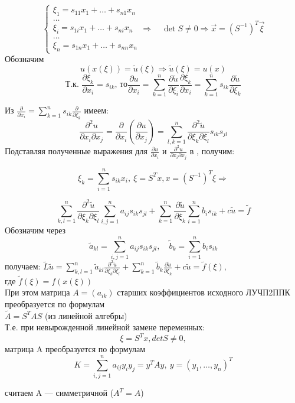 \[
\begin{cases}
\xi_1 = s_{11}x_1 + \ldots + s_{n1}x_n \\
\ldots \\
\xi_i = s_{1i}x_1 + \ldots + s_{ni}x_n \\
\ldots \\
\xi_n = s_{1n}x_1 + \ldots + s_{nn}x_n
\end{cases}\Longrightarrow
\quad \det S \neq 0 \Longrightarrow \vec x=(S^{-1})^T\vec\xi
\]
Обозначим
\[
u(x(\xi))=\tilde{u}(\xi) \Rightarrow \tilde{u}(\xi)=u(x)\]
\[
\text{Т.к. } \frac{\partial \xi_k}{\partial x_i} = s_{ik} \text{, то} \frac{\partial u}{\partial x_i} = \sum_{k=1}^n\frac{\partial \tilde{u}}{\partial \xi_i}\frac{\partial \xi_k}{\partial x_i} = \sum_{k=1}^ns_{ik}\frac{\partial \tilde{u}}{\partial \xi_k}
\]


\begin{note}
Из $\displaystyle\frac{\partial }{\partial x_i} = \sum_{k=1}^n s_{ik}\frac{\partial}{\partial \xi_k}$ имеем:
\[\frac{\partial^2u}{\partial x_i \partial x_j}=\frac{\partial}{\partial x_i}(\frac{\partial u}{\partial x_j})=\sum_{l,k=1}^{n}\frac{\partial^2 \tilde{u}}{\partial\xi_k \partial\xi_l}s_{ik}s_{jl}\]
Подставляя полученные выражения для $\frac{\partial u}{\partial x_i}$ и $\frac{\partial^2 u}{\partial x_i \partial x_j}$ в \LDUChPSPPK{}, получим:

\[\xi_k=\sum_{i=1}^{n}s_{ik}x_i,\ \xi=S^Tx, x=(S^{-1})^T\xi\Rightarrow\]

\[
\sum_{k,l=1}^n \frac{\partial^2 \tilde{u}}{\partial \xi_k \partial \xi_l} \sum_{i,j=1}^n a_{ij}s_{ik}s_{jl} + \sum_{k=1}^n \frac{\partial \tilde{u}}{\partial \xi_k}\sum_{i=1}^nb_is_{ik}+c\tilde{u}=\tilde{f}
\]
Обозначим через 
\[\tilde{a}_{kl}=\sum_{i,j=1}^na_{ij}s_{ik}s_{jl}, \quad\tilde{b}_k=\sum_{i=1}^nb_is_{ik}\]
получаем:
$\displaystyle
\tilde{L}\tilde{u}=\sum_{k,l=1}^n\tilde{a}_{kl}\frac{\partial^2\tilde{u}}{\partial\xi_k\partial\xi_l}+\sum_{k=1}^n\tilde{b}_k\frac{\partial\tilde{u}}{\partial\xi_k}+c\tilde{u}=\tilde{f}(\xi),
$\\
где $\tilde{f}(\xi)=f(x(\xi))$\\
При этом матрица $A=(a_{ik})$ старших коэффициентов исходного ЛУЧП2ППК преобразуется по формулам\\
$
\displaystyle
  \tilde{A}=S^TAS 
$
   (из линейной алгебры)\\
Т.е. при невырожденной линейной замене переменных:
\[
\xi=S^Tx, detS\ne0,
\] матрица A преобразуется по формулам
\[
K=\sum_{i,j=1}^na_{ij}y_iy_j=y^TAy,\ y=(y_1, \ldots, y_n)^T
\]
\end{note}

\begin{note}
считаем A --- симметричной ($A^T=A$)
\end{note}
